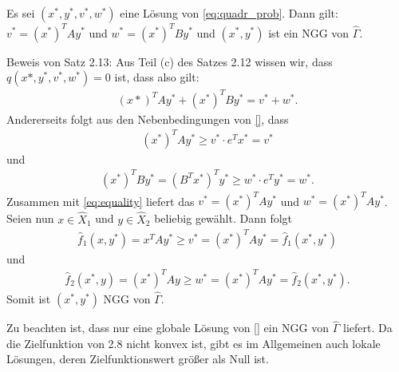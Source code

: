 \begin{satz}
Es sei $(x^{*}, y^{*}, v^{*}, w^{*})$ eine Lösung von \eqref{eq:quadr_prob}. Dann gilt: $v^{*} = (x^{*})^{T} Ay^{*}$ und $w^{*} = (x^{*})^{T} By^{*}$ und $(x^{*}, y^{*})$ ist ein NGG von $\hat\Gamma$.
\end{satz}
\begin{beweis}
Beweis von Satz 2.13: Aus Teil (c) des Satzes 2.12 wissen wir, dass $q(x*, y^{*}, v^{*}, w^{*}) = 0$ ist, dass also gilt:  
\begin{align}\label{eq:equality}
  (x*)^{T}Ay^{*} + (x^{*})^{T}By^{*} =  v^{*}+ w^{*}.
\end{align}
Andererseits folgt aus den Nebenbedingungen von \eqref{}, dass
\begin{align*}
  (x^{*})^{T}Ay^{*} \geq v^{*}\cdot e^{T}x^{*} = v^{*}
\end{align*}
und 
\begin{align*}
  (x^{*})^{T}By^{*} = (B^{T}x^{*})^{T} y^{*} \geq w^{*}\cdot e^{T}y^{*} = w^{*}. 
\end{align*}
Zusammen mit \eqref{eq:equality} liefert das $v^{*} = (x^{*})^{T}Ay^{*}$ und $w^{*} = (x^{*})^{T}Ay^{*}$. Seien nun $x \in \hat X_{1}$ und $y \in \hat X_{2}$ beliebig gewählt. Dann folgt
\begin{align*}
  \hat f_{1} (x, y^{*}) = x^{T}Ay^{*} \geq v^{*} = (x^{*})^{T}Ay^{*} = \hat f_{1}(x^{*}, y^{*})
\end{align*}
und
\begin{align*}
  \hat f_{2} (x^{*}, y) = (x^{*})^{T}Ay \geq w^{*} = (x^{*})^{T}Ay^{*} = \hat f_{2}(x^{*}, y^{*}).
\end{align*}
Somit ist $(x^{*}, y^{*})$ NGG von $\hat \Gamma$. 
\end{beweis}
\begin{bemerkung*}
  Zu beachten ist, dass nur eine globale Lösung von \eqref{} ein NGG von $\hat \Gamma$ liefert. Da die Zielfunktion von 2.8 nicht konvex ist, gibt es im Allgemeinen auch lokale Lösungen, deren Zielfunktionswert größer als Null ist. 
\end{bemerkung*}



